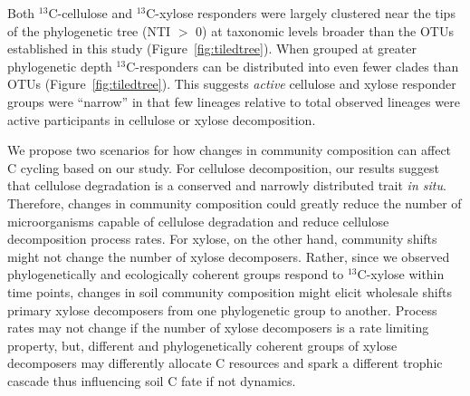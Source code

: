 Both $^{13}$C-cellulose and $^{13}$C-xylose responders were largely clustered
near the tips of the phylogenetic tree (NTI $>$ 0) at taxonomic levels broader
than the OTUs established in this study (Figure~\ref{fig:tiledtree}). When
grouped at greater phylogenetic depth $^{13}$C-responders can be distributed
into even fewer clades than OTUs (Figure~\ref{fig:tiledtree}). This suggests
\textit{active} cellulose and xylose responder groups were ``narrow'' in that
few lineages relative to total observed lineages were active participants in
cellulose or xylose decomposition. 

We propose two scenarios for how changes in community composition can affect
C cycling based on our study. For cellulose decomposition, our results suggest
that cellulose degradation is a conserved and narrowly distributed trait
\textit{in situ}. Therefore, changes in community composition could greatly
reduce the number of microorganisms capable of cellulose degradation and reduce
cellulose decomposition process rates. For xylose, on the other hand, community
shifts might not change the number of xylose decomposers. Rather, since we
observed phylogenetically and ecologically coherent groups respond to
$^{13}$C-xylose within time points, changes in soil community composition might
elicit wholesale shifts primary xylose decomposers from one phylogenetic group
to another. Process rates may not change if the number of xylose decomposers is
a rate limiting property, but, different and phylogenetically coherent groups
of xylose decomposers may differently allocate C resources and
spark a different trophic cascade thus influencing soil C fate if not dynamics. 

